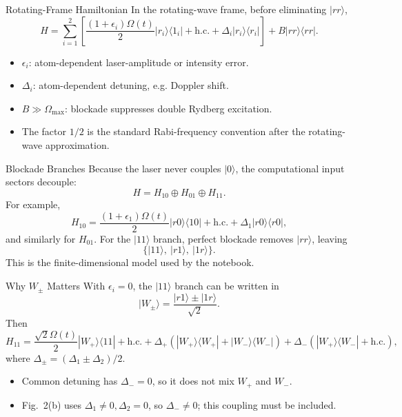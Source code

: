 \documentclass[aspectratio=169]{beamer}
\begin{document}
\begin{frame}{Rotating-Frame Hamiltonian}
  In the rotating-wave frame, before eliminating \(|rr\rangle\),
  \[
    H =
      \sum_{i=1}^{2}
      \left[
        \frac{(1+\epsilon_i)\Omega(t)}{2}
        |r_i\rangle\langle 1_i|
        + \mathrm{h.c.}
        + \Delta_i |r_i\rangle\langle r_i|
      \right]
      + B |rr\rangle\langle rr| .
  \]
  \begin{itemize}
    \item \(\epsilon_i\): atom-dependent laser-amplitude or intensity error.
    \item \(\Delta_i\): atom-dependent detuning, e.g. Doppler shift.
    \item \(B\gg \Omega_{\max}\): blockade suppresses double Rydberg excitation.
    \item The factor \(1/2\) is the standard Rabi-frequency convention after the rotating-wave approximation.
  \end{itemize}
\end{frame}

\begin{frame}{Blockade Branches}
  Because the laser never couples \(|0\rangle\), the computational input sectors decouple:
  \[
    H = H_{10}\oplus H_{01}\oplus H_{11}.
  \]
  For example,
  \[
    H_{10}=
      \frac{(1+\epsilon_1)\Omega(t)}{2}|r0\rangle\langle 10|
      +\mathrm{h.c.}
      +\Delta_1|r0\rangle\langle r0|,
  \]
  and similarly for \(H_{01}\). For the \(|11\rangle\) branch, perfect blockade removes \(|rr\rangle\), leaving
  \[
    \{|11\rangle,\ |r1\rangle,\ |1r\rangle\}.
  \]
  This is the finite-dimensional model used by the notebook.
\end{frame}

\begin{frame}{Why \(W_\pm\) Matters}
  With \(\epsilon_i=0\), the \(|11\rangle\) branch can be written in
  \[
    |W_\pm\rangle=\frac{|r1\rangle\pm |1r\rangle}{\sqrt{2}} .
  \]
  Then
  \[
    H_{11}
      =
      \frac{\sqrt{2}\Omega(t)}{2}|W_+\rangle\langle 11|
      +\mathrm{h.c.}
      +\Delta_+\left(|W_+\rangle\langle W_+|+|W_-\rangle\langle W_-|\right)
      +\Delta_-\left(|W_+\rangle\langle W_-|+\mathrm{h.c.}\right),
  \]
  where \(\Delta_\pm=(\Delta_1\pm\Delta_2)/2\).
  \begin{itemize}
    \item Common detuning has \(\Delta_-=0\), so it does not mix \(W_+\) and \(W_-\).
    \item Fig.~2(b) uses \(\Delta_1\neq0,\Delta_2=0\), so \(\Delta_-\neq0\); this coupling must be included.
  \end{itemize}
\end{frame}
\end{document}
